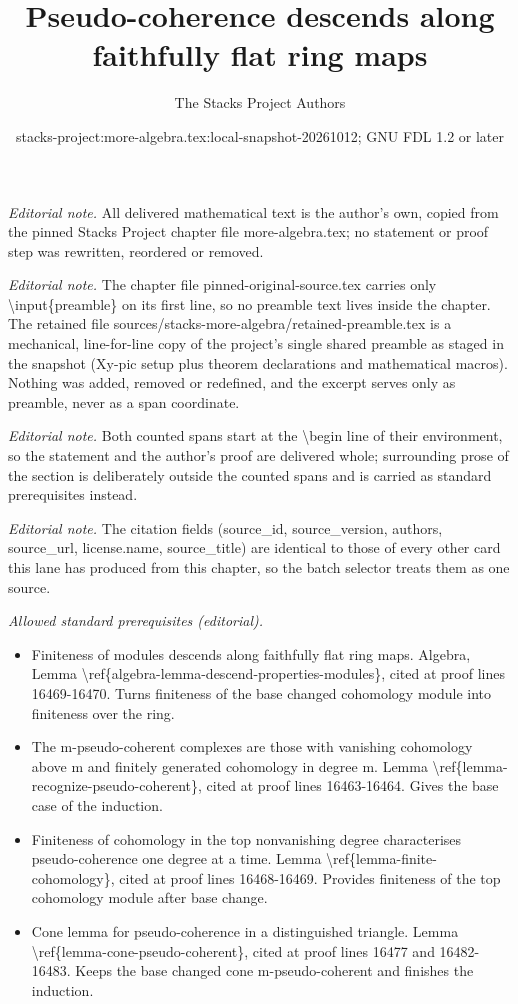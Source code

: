 \documentclass[10pt,a4paper]{amsart}
\title{Pseudo-coherence descends along faithfully flat ring maps}
\author{The Stacks Project Authors}
\date{stacks-project:more-algebra.tex:local-snapshot-20261012; GNU FDL 1.2 or later}
\theoremstyle{plain}
\theoremstyle{definition}
\theoremstyle{remark}
\numberwithin{equation}{subsection}
\begin{document}
\maketitle
\setcounter{subsection}{1}
\noindent\textit{Editorial note.} All delivered mathematical text is the author's own, copied from the pinned Stacks Project chapter file more-algebra.tex; no statement or proof step was rewritten, reordered or removed.\par\medskip
\noindent\textit{Editorial note.} The chapter file pinned-original-source.tex carries only \textbackslash{}input\{preamble\} on its first line, so no preamble text lives inside the chapter. The retained file sources/stacks-more-algebra/retained-preamble.tex is a mechanical, line-for-line copy of the project's single shared preamble as staged in the snapshot (Xy-pic setup plus theorem declarations and mathematical macros). Nothing was added, removed or redefined, and the excerpt serves only as preamble, never as a span coordinate.\par\medskip
\noindent\textit{Editorial note.} Both counted spans start at the \textbackslash{}begin line of their environment, so the statement and the author's proof are delivered whole; surrounding prose of the section is deliberately outside the counted spans and is carried as standard prerequisites instead.\par\medskip
\noindent\textit{Editorial note.} The citation fields (source\_id, source\_version, authors, source\_url, license.name, source\_title) are identical to those of every other card this lane has produced from this chapter, so the batch selector treats them as one source.\par\medskip
\noindent\textit{Allowed standard prerequisites (editorial).}\begin{itemize}
\item Finiteness of modules descends along faithfully flat ring maps. Algebra, Lemma \textbackslash{}ref\{algebra-lemma-descend-properties-modules\}, cited at proof lines 16469-16470. Turns finiteness of the base changed cohomology module into finiteness over the ring.
\item The m-pseudo-coherent complexes are those with vanishing cohomology above m and finitely generated cohomology in degree m. Lemma \textbackslash{}ref\{lemma-recognize-pseudo-coherent\}, cited at proof lines 16463-16464. Gives the base case of the induction.
\item Finiteness of cohomology in the top nonvanishing degree characterises pseudo-coherence one degree at a time. Lemma \textbackslash{}ref\{lemma-finite-cohomology\}, cited at proof lines 16468-16469. Provides finiteness of the top cohomology module after base change.
\item Cone lemma for pseudo-coherence in a distinguished triangle. Lemma \textbackslash{}ref\{lemma-cone-pseudo-coherent\}, cited at proof lines 16477 and 16482-16483. Keeps the base changed cone m-pseudo-coherent and finishes the induction.
\end{itemize}\medskip
\end{document}
